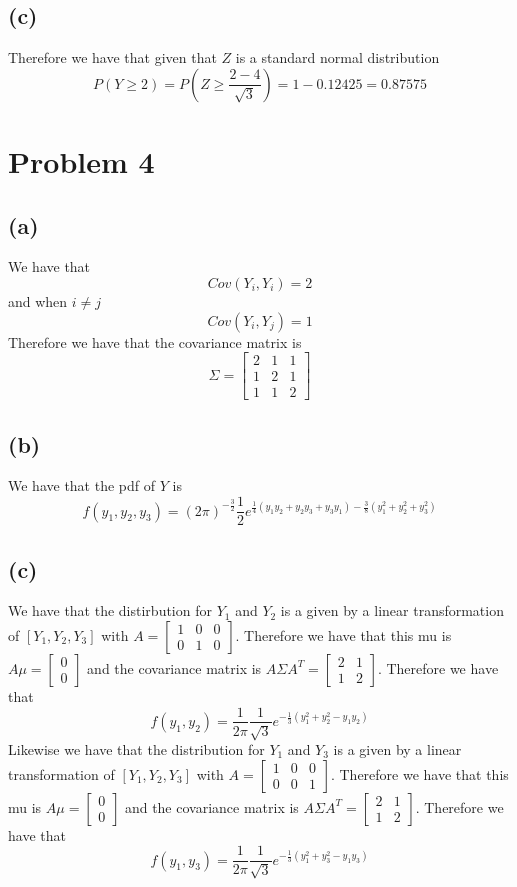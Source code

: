 \subsection*{(c)}
Therefore we have that given that $Z$ is a standard normal distribution
$$P(Y\geq 2)=P(Z\geq \frac{2-4}{\sqrt{3}})=1-0.12425=\boxed{0.87575}$$
\section*{Problem 4}
\subsection*{(a)}
We have that 
$$Cov(Y_i,Y_i)=2$$
and when  $i\neq j$
$$Cov(Y_i,Y_j)=1$$
Therefore we have that the covariance matrix is 
$$\Sigma=\begin{bmatrix}
2&1&1\\
1&2&1\\
1&1&2
\end{bmatrix}$$
\subsection*{(b)}
We have that the pdf of $Y$ is
$$f(y_1,y_2,y_3)=(2\pi)^{-\frac{3}{2}}\frac{1}{2}e^{\frac{1}{4}(y_1y_2+y_2y_3+y_3y_1)
-\frac{3}{8}(y_1^2+y_2^2+y_3^2)}$$
\subsection*{(c)}
We have that the distirbution for $Y_1$ and $Y_2$ is a 
given by a linear transformation of $[Y_1,Y_2,Y_3]$ with 
$A=\begin{bmatrix}1&0&0\\0&1&0\end{bmatrix}$. Therefore we have 
that this mu is $A\mu=\begin{bmatrix}0\\0\end{bmatrix}$ and
the covariance matrix is $A\Sigma A^T=\begin{bmatrix}2&1\\1&2\end{bmatrix}$.
Therefore we have that 
$$f(y_1,y_2)=\frac{1}{2\pi}\frac{1}{\sqrt{3}}e^{-\frac{1}{3}(y_1^2+y_2^2-y_1y_2)}$$
Likewise we have that the distribution for $Y_1$ and $Y_3$ is a
given by a linear transformation of $[Y_1,Y_2,Y_3]$ with
$A=\begin{bmatrix}1&0&0\\0&0&1\end{bmatrix}$. Therefore we have
that this mu is $A\mu=\begin{bmatrix}0\\0\end{bmatrix}$ and
the covariance matrix is $A\Sigma A^T=\begin{bmatrix}2&1\\1&2\end{bmatrix}$.
Therefore we have that
$$f(y_1,y_3)=\frac{1}{2\pi}\frac{1}{\sqrt{3}}e^{-\frac{1}{3}(y_1^2+y_3^2-y_1y_3)}$$
